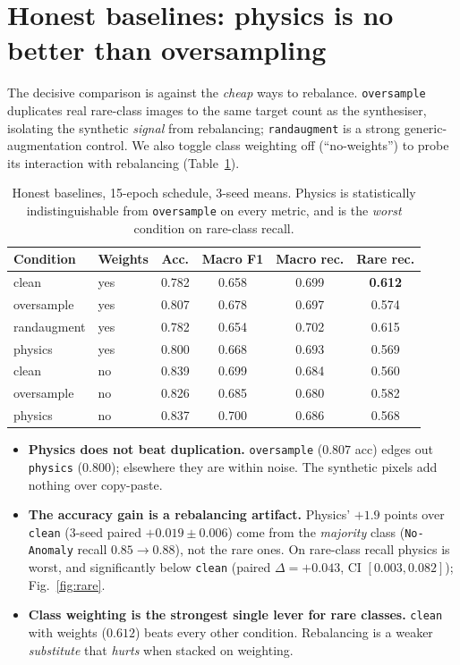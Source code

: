 \documentclass[a4paper]{article}
\begin{document}
\section{Honest baselines: physics is no better than oversampling}
The decisive comparison is against the \emph{cheap} ways to rebalance.
\texttt{oversample} duplicates real rare-class images to the same target count as
the synthesiser, isolating the synthetic \emph{signal} from rebalancing;
\texttt{randaugment} is a strong generic-augmentation control. We also toggle
class weighting off (``no-weights'') to probe its interaction with rebalancing
(Table~\ref{tab:main}).

\begin{table}[h]\centering
\begin{tabular}{llcccc}
\toprule
Condition & Weights & Acc. & Macro F1 & Macro rec. & \textbf{Rare rec.}\\
\midrule
clean        & yes & 0.782 & 0.658 & 0.699 & \textbf{0.612}\\
oversample   & yes & 0.807 & 0.678 & 0.697 & 0.574\\
randaugment  & yes & 0.782 & 0.654 & 0.702 & 0.615\\
physics      & yes & 0.800 & 0.668 & 0.693 & 0.569\\
\midrule
clean        & no  & 0.839 & 0.699 & 0.684 & 0.560\\
oversample   & no  & 0.826 & 0.685 & 0.680 & 0.582\\
physics      & no  & 0.837 & 0.700 & 0.686 & 0.568\\
\bottomrule
\end{tabular}
\caption{Honest baselines, 15-epoch schedule, 3-seed means. Physics is
statistically indistinguishable from \texttt{oversample} on every metric, and is
the \emph{worst} condition on rare-class recall.}
\label{tab:main}
\end{table}

\begin{itemize}
  \item \textbf{Physics does not beat duplication.} \texttt{oversample} ($0.807$
        acc) edges out \texttt{physics} ($0.800$); elsewhere they are within
        noise. The synthetic pixels add nothing over copy-paste.
  \item \textbf{The accuracy gain is a rebalancing artifact.} Physics' $+1.9$
        points over \texttt{clean} (3-seed paired $+0.019\pm0.006$) come from the
        \emph{majority} class (\texttt{No-Anomaly} recall $0.85\!\to\!0.88$), not
        the rare ones. On rare-class recall physics is worst, and significantly
        below \texttt{clean} (paired $\Delta=+0.043$, CI $[0.003,0.082]$);
        Fig.~\ref{fig:rare}.
  \item \textbf{Class weighting is the strongest single lever for rare classes.}
        \texttt{clean} with weights ($0.612$) beats every other condition.
        Rebalancing is a weaker \emph{substitute} that \emph{hurts} when stacked
        on weighting.
\end{itemize}
\end{document}
